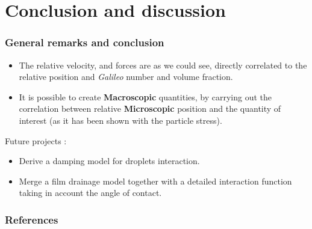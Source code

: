 \documentclass{sintefbeamer}
\begin{document}
\section{Conclusion and discussion}
\begin{frame}
  \frametitle{General remarks and conclusion}

  \begin{itemize}
    \item The relative velocity, and forces are as we could see, directly correlated to the relative position and \textit{Galileo} number and volume fraction. 
    \item It is possible to create \textbf{Macroscopic} quantities, by carrying out the correlation between relative \textbf{Microscopic} position and the quantity of interest (as it has been shown with the particle stress). 
  \end{itemize}
  Future projects :   
  \begin{itemize}
    \item Derive a damping model for droplets interaction.
    \item Merge a film drainage model together with a detailed interaction function taking in account the angle of contact.
  \end{itemize}

\end{frame}

\begin{frame}[t]
  \frametitle{References}
  
\end{frame}
  
\end{document}

